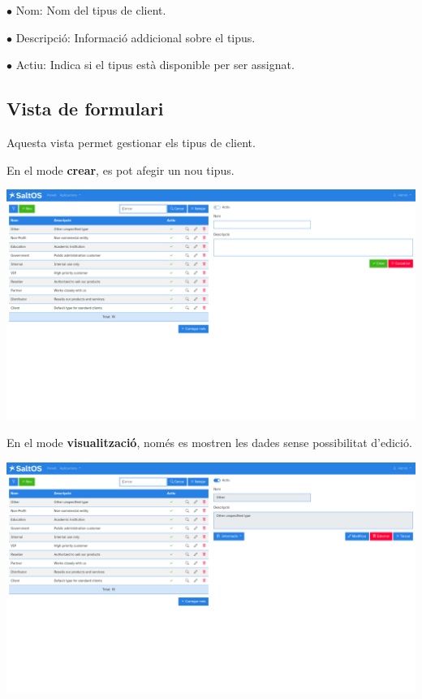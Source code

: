 \documentclass[a4paper]{article}
\begin{document}
\begin{compactitem}
\item[\color{myblue}$\bullet$] Nom: Nom del tipus de client.
\item[\color{myblue}$\bullet$] Descripció: Informació addicional sobre el tipus.
\item[\color{myblue}$\bullet$] Actiu: Indica si el tipus està disponible per ser assignat.
\end{compactitem}

\hypertarget{toc54}{}
\subsection{Vista de formulari}

Aquesta vista permet gestionar els tipus de client.

En el mode \textbf{crear}, es pot afegir un nou tipus.

\begin{center}\includegraphics[width=1\textwidth]{../ujest/snaps/test-screenshots-js-screenshots-crm-customers-types-create-ca-es-1-snap.png}\end{center}

En el mode \textbf{visualització}, només es mostren les dades sense possibilitat d’edició.

\begin{center}\includegraphics[width=1\textwidth]{../ujest/snaps/test-screenshots-js-screenshots-crm-customers-types-view-10-ca-es-1-snap.png}\end{center}
\end{document}
